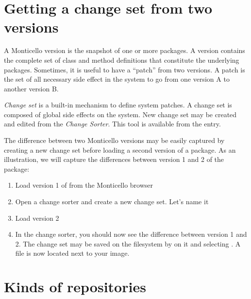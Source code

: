 \documentclass[a4paper,10pt,twoside]{book}
\begin{document}

\section{Getting a change set from two versions}
A Monticello version is the snapshot of one or more packages. A version contains the complete set of class and method definitions that constitute the underlying packages. Sometimes, it is useful to have a ``patch'' from two versions. A patch is the set of all necessary side effect in the system to go from one version A to another version B. 

\emph{Change set} is a \pharo built-in mechanism to define system patches. A change set is composed of global side effects on the system. New change set may be created and edited from the \emph{Change Sorter}. This tool is available from the  entry.

The difference between two Monticello versions may be easily captured by creating a new change set before loading a second version of a package. As an illustration, we will capture the differences between version 1 and 2 of the  package:
\begin{enumerate}
\item Load version 1 of  from the Monticello browser
\item Open a change sorter and create a new change set. Let's name it 
\item Load version 2
\item In the change sorter, you should now see the difference between version 1 and 2. The change set may be saved on the filesystem by  on it and selecting . A  file is now located next to your \pharo image.
\end{enumerate}


\section{Kinds of repositories}
\end{document}
